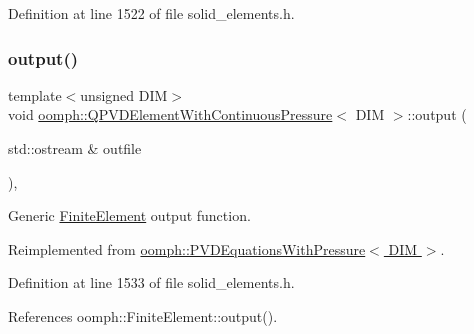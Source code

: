 Definition at line 1522 of file solid\+\_\+elements.\+h.

\mbox{\label{classoomph_1_1QPVDElementWithContinuousPressure_acc858925ae5724c02fc1073130f67430}} 
\subsubsection{\texorpdfstring{output()}{output()}\hspace{0.1cm}{\footnotesize\ttfamily [1/4]}}
{\footnotesize\ttfamily template$<$unsigned D\+IM$>$ \\
void \hyperlink{classoomph_1_1QPVDElementWithContinuousPressure}{oomph\+::\+Q\+P\+V\+D\+Element\+With\+Continuous\+Pressure}$<$ D\+IM $>$\+::output (\begin{DoxyParamCaption}\item[{std\+::ostream \&}]{outfile }\end{DoxyParamCaption})\hspace{0.3cm}{\ttfamily [inline]}, {\ttfamily [virtual]}}



Generic \hyperlink{classoomph_1_1FiniteElement}{Finite\+Element} output function. 



Reimplemented from \hyperlink{classoomph_1_1PVDEquationsWithPressure_a1853eace3f079f90cc34df8029bd3dba}{oomph\+::\+P\+V\+D\+Equations\+With\+Pressure$<$ D\+I\+M $>$}.



Definition at line 1533 of file solid\+\_\+elements.\+h.



References oomph\+::\+Finite\+Element\+::output().

\mbox{\label{classoomph_1_1QPVDElementWithContinuousPressure_a52659b143c819c1fcc86a6473ef324f0}} 
